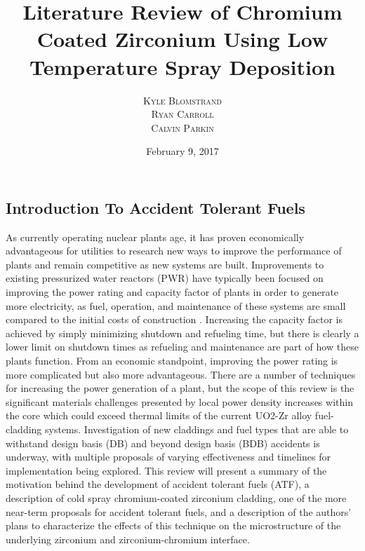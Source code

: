 \documentclass{article}
\title{Literature Review of Chromium Coated Zirconium Using Low Temperature Spray Deposition}
\author{ \textsc{Kyle Blomstrand} \\ \textsc{Ryan Carroll}\\ \textsc{Calvin Parkin}}
\date{February 9, 2017}
\begin{document}
\maketitle
\doublespacing
\subsection*{Introduction To Accident Tolerant Fuels}


As currently operating nuclear plants age, it has proven economically advantageous for utilities to research new ways to improve the performance of plants and remain competitive as new systems are built.  Improvements to existing pressurized water reactors (PWR) have typically been focused on improving the power rating and capacity factor of plants in order to generate more electricity, as fuel, operation, and maintenance of these systems are small compared to the initial costs of construction \cite{Zinkle:1}. Increasing the capacity factor is achieved by simply minimizing shutdown and refueling time, but there is clearly a lower limit on shutdown times as refueling and maintenance are part of how these plants function. From an economic standpoint, improving the power rating is more complicated but also more advantageous. There are a number of techniques for increasing the power generation of a plant, but the scope of this review is the significant materials challenges presented by local power density increases within the core which could exceed thermal limits of the current UO2-Zr alloy fuel-cladding systems. Investigation of new claddings and fuel types that are able to withstand design basis (DB) and beyond design basis (BDB) accidents is underway, with multiple proposals of varying effectiveness and timelines for implementation being explored. This review will present a summary of the motivation behind the development of accident tolerant fuels (ATF), a description of cold spray chromium-coated zirconium cladding, one of the more near-term proposals for accident tolerant fuels, and a description of the authors’ plans to characterize the effects of this technique on the microstructure of the underlying zirconium and zirconium-chromium interface.
\end{document}
